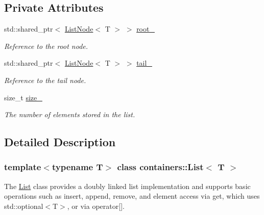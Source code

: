 \subsection*{Private Attributes}
\begin{DoxyCompactItemize}
\item 
\mbox{\label{classcontainers_1_1_list_adbbbbae2d1b234307451c0561a7cd1db}} 
std\+::shared\+\_\+ptr$<$ \hyperlink{classcontainers_1_1_list_node}{List\+Node}$<$ T $>$ $>$ \hyperlink{classcontainers_1_1_list_adbbbbae2d1b234307451c0561a7cd1db}{root\+\_\+}
\begin{DoxyCompactList}\small\item\em Reference to the root node. \end{DoxyCompactList}\item 
\mbox{\label{classcontainers_1_1_list_a59047cbff0b14426db221552d008e99e}} 
std\+::shared\+\_\+ptr$<$ \hyperlink{classcontainers_1_1_list_node}{List\+Node}$<$ T $>$ $>$ \hyperlink{classcontainers_1_1_list_a59047cbff0b14426db221552d008e99e}{tail\+\_\+}
\begin{DoxyCompactList}\small\item\em Reference to the tail node. \end{DoxyCompactList}\item 
\mbox{\label{classcontainers_1_1_list_af5ec7defa4d55596c15d57fddb6c2ebf}} 
size\+\_\+t \hyperlink{classcontainers_1_1_list_af5ec7defa4d55596c15d57fddb6c2ebf}{size\+\_\+}
\begin{DoxyCompactList}\small\item\em The number of elements stored in the list. \end{DoxyCompactList}\end{DoxyCompactItemize}


\subsection{Detailed Description}
\subsubsection*{template$<$typename T$>$\newline
class containers\+::\+List$<$ T $>$}

The {\ttfamily \hyperlink{classcontainers_1_1_list}{List}} class provides a doubly linked list implementation and supports basic operations such as {\ttfamily insert}, {\ttfamily append}, {\ttfamily remove}, and element access via {\ttfamily get}, which uses {\ttfamily std\+::optional$<$\+T$>$}, or via {\ttfamily operator}\mbox{[}\mbox{]}. 

